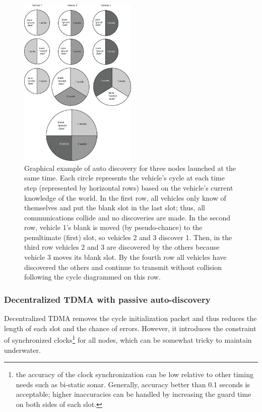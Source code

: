 \documentclass[11pt, letterpaper, oneside]{memoir}
\begin{document}
\begin{figure}
\centering
\includegraphics[width=0.5\textwidth]{slots.eps}
\caption{Graphical example of auto discovery for three nodes launched at the same time. Each circle represents the vehicle's cycle at each time step (represented by horizontal rows) based on the vehicle's current knowledge of the world. In the first row, all vehicles only know of themselves and put the blank slot in the last slot; thus, all communications collide and no discoveries are made. In the second row, vehicle 1's blank is moved (by pseudo-chance) to the penultimate (first) slot, so vehicles 2 and 3 discover 1. Then, in the third row vehicles 2 and 3 are discovered by the others because vehicle 3 moves its blank slot. By the fourth row all vehicles have discovered the others and continue to transmit without collision following the cycle diagrammed on this row.} 
\label{fig:decentralized_cycles}
\end{figure}

\subsubsection{Decentralized TDMA with passive auto-discovery}

Decentralized TDMA removes the cycle initialization packet and thus reduces the length of each slot and the chance of errors. However, it introduces the constraint of synchronized clocks\footnote{the accuracy of the clock synchronization can be  low relative to other timing needs such as bi-static sonar. Generally, accuracy better than 0.1 seconds is acceptable; higher inaccuracies can be handled by increasing the guard time on both sides of each slot.} for all nodes, which can be somewhat tricky to maintain underwater.
\end{document}
